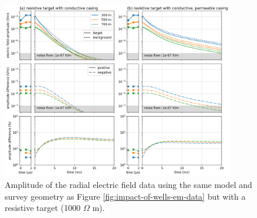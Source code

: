 \begin{figure}[!htb]
    \begin{center}
    \includegraphics[width=0.9\textwidth]{figures/impact-of-wells-em-data-resistive.png}
    \end{center}
\caption{
    Amplitude of the radial electric field data using the same model and survey geometry as Figure \ref{fig:impact-of-wells-em-data} but with a resistive target (1000 $\Omega$ m).
}
\label{fig:impact-of-wells-em-data-resistive}
\end{figure}
